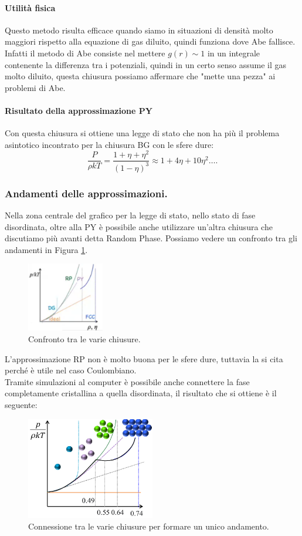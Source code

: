 \paragraph{Utilità fisica}
Questo metodo risulta efficace quando siamo in situazioni di densità molto maggiori rispetto alla equazione di gas diluito, quindi funziona dove Abe fallisce. Infatti il metodo di Abe consiste nel mettere $g(r)\sim 1$ in un integrale contenente la differenza tra i potenziali, quindi in un certo senso assume il gas molto diluito, questa chiusura possiamo affermare che "mette una pezza" ai problemi di Abe.
\paragraph{Risultato della approssimazione PY}
Con questa chiusura si ottiene una legge di stato che non ha più il problema asintotico incontrato per la chiusura BG con le sfere dure:
\[
	\frac{P}{\rho kT}=\frac{1+\eta+\eta^2}{\left( 1-\eta \right)^3}
	\approx 
	1 + 4\eta+10\eta^2\ldots
.\] 
\subsubsection{Andamenti delle approssimazioni.}
Nella zona centrale del grafico per la legge di stato, nello stato di fase disordinata, oltre alla PY è possibile anche utilizzare un'altra chiusura che discutiamo più avanti detta Random Phase. Possiamo vedere un confronto tra gli andamenti in Figura \ref{fig:chiusure-confronto}.
\begin{figure}[ht]
	\centering
	\includegraphics[width=0.3\textwidth]{figures/Confronto-chiusure.png}
	\caption{Confronto tra le varie chiusure.}
	\label{fig:chiusure-confronto}
\end{figure}
L'approssimazione RP non è molto buona per le sfere dure, tuttavia la si cita perché è utile nel caso Coulombiano.\\
Tramite simulazioni al computer è possibile anche connettere la fase completamente cristallina a quella disordinata, il risultato che si ottiene è il seguente:
\begin{figure}[H]
	\centering
	\includegraphics[width=0.5\textwidth]{figures/connessione-RP-PY-BG.png}
	\caption{Connessione tra le varie chiusure per formare un unico andamento.}
	\label{fig:PY-RP-BG}
\end{figure}
